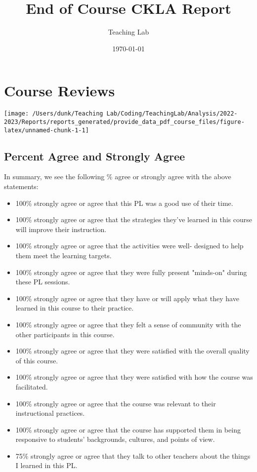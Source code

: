 \documentclass[10,a4paperpaper,]{article}
\title{End of Course CKLA Report}
\author{Teaching Lab}
\date{\today}
\begin{document}
\renewcommand{\contentsname}{Table of Contents}

\renewcommand{\pagename}{Page}


\maketitle
\tableofcontents
{}

\section{Course Reviews}

\begin{center}\texttt{[image: /Users/dunk/Teaching Lab/Coding/TeachingLab/Analysis/2022-2023/Reports/reports\_generated/provide\_data\_pdf\_course\_files/figure-latex/unnamed-chunk-1-1]} \end{center}

\subsection{Percent Agree and Strongly Agree}

In summary, we see the following \% agree or strongly agree with the
above statements:

\begin{itemize}
\tightlist
\item
  100\% strongly agree or agree that this PL was a good use of their
  time.
\item
  100\% strongly agree or agree that the strategies they've learned in
  this course will improve their instruction.
\item
  100\% strongly agree or agree that the activities were well- designed
  to help them meet the learning targets.
\item
  100\% strongly agree or agree that they were fully present "minds-on"
  during these PL sessions.
\item
  100\% strongly agree or agree that they have or will apply what they
  have learned in this course to their practice.
\item
  100\% strongly agree or agree that they felt a sense of community with
  the other participants in this course.
\item
  100\% strongly agree or agree that they were satisfied with the
  overall quality of this course.
\item
  100\% strongly agree or agree that they were satisfied with how the
  course was facilitated.
\item
  100\% strongly agree or agree that the course was relevant to their
  instructional practices.
\item
  100\% strongly agree or agree that the course has supported them in
  being responsive to students' backgrounds, cultures, and points of
  view.
\item
  75\% strongly agree or agree that they talk to other teachers about
  the things I learned in this PL.
\end{itemize}
\end{document}
